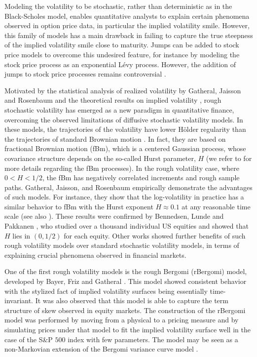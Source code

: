 Modeling the volatility to be stochastic, rather than deterministic as in the Black-Scholes model, enables quantitative analysts to  explain certain phenomena observed in option price data, in particular the implied volatility smile. However, this family of models has a  main drawback in failing  to capture the true steepness of the implied volatility smile close to maturity. Jumps can be added to stock price models to overcome this undesired feature, for instance by modeling the stock price process as an exponential L\'evy process. However, the addition of jumps to stock price processes remains controversial \cite{christensen2014fact,bajgrowicz2015jumps}. 

Motivated by the statistical analysis of realized volatility by Gatheral, Jaisson and Rosenbaum \cite{gatheral2018volatility} and the theoretical results on implied volatility    \cite{alos2007short,fukasawa2011asymptotic}, rough stochastic volatility has emerged as a new paradigm in quantitative finance, overcoming the observed limitations of  diffusive stochastic volatility models. In these models, the trajectories of the volatility  have lower H\"older regularity than the trajectories of standard Brownian motion \cite{bayer2016pricing,gatheral2018volatility}. In fact, they are based on fractional Brownian motion (fBm), which  is a centered Gaussian process, whose covariance structure depends on  the so-called Hurst parameter, $H$ (we refer to  \cite{mandelbrot1968fractional,coutin07introduction,biagini2008stochastic} for more details regarding the fBm processes). In the rough volatility case, where $0<H<1/2$, the fBm has negatively correlated increments and rough sample paths.   Gatheral, Jaisson, and Rosenbaum \cite{gatheral2018volatility}  empirically demonstrate the advantages of such models. For instance, they show that the log-volatility in practice has a similar behavior to  fBm with the Hurst exponent $H \approx 0.1$ at any reasonable time scale (see also  \cite{gatheral2014volatility_2}).  These results were confirmed  by Bennedsen, Lunde and Pakkanen \cite{bennedsen2016decoupling}, who studied over a thousand individual US equities and showed that $H$ lies in $(0,1/2)$ for each equity. Other  works \cite{bennedsen2016decoupling,bayer2016pricing,gatheral2018volatility} showed further benefits of  such rough volatility models over  standard stochastic volatility models,   in terms of explaining crucial phenomena  observed in  financial markets.
 
One of the first rough volatility models is the rough Bergomi (rBergomi) model, developed by Bayer, Friz and Gatheral \cite{bayer2016pricing}. This model showed   consistent behavior with the stylized fact of implied volatility surfaces being essentially time-invariant. It was also observed that this model is able to capture the term structure of skew observed in equity markets. The construction of the rBergomi model was performed by  moving from a physical to a pricing measure and by simulating prices under that model to fit  the implied volatility surface well in the case of the S\&P $500$ index with few parameters. The model may be seen as a non-Markovian extension of the Bergomi variance curve model \cite{bergomi2005smile}.
 
